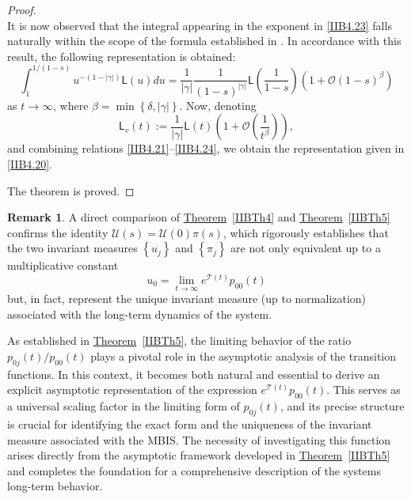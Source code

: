 \documentclass[10pt,reqno]{amsart}
\theoremstyle{definition}
\newtheorem{remark}{Remark}
\numberwithin{equation}{section}
\begin{document}
\begin{proof}
\begin{equation}
\end{equation}
    It is now observed that the integral appearing in the exponent in {\eqref{IIB4.23}} falls naturally
    within the scope of the formula established in {\cite[Th5]{ImMDPI24}}. In accordance with this result, the
    following representation is obtained:
\begin{equation}                \label{IIB4.24}
    \int_{1}^{{1}/{(1-s)}}{{u^{-(1-|\gamma|)}}\textsf{L}(u)du}=\frac{1}{|\gamma|}\frac{1}{{(1-s)}^{|\gamma|}}
    \textsf{L}\left(\frac{1}{1-s}\right)\left(1+\mathcal{O}{{(1-s)}^{\beta}} \right)
\end{equation}
    as $t\to\infty$, where $\beta=\min\left\{\delta,|\gamma|\right\}$. Now, denoting
\[
    {\textsf{L}_v}(t):=\frac{1}{|\gamma|}\textsf{L}(t)\left(1+\mathcal{O}{{\left(\frac{1}{t^{\beta}}\right)}}\right),
\]
    and combining relations {\eqref{IIB4.21}}--{\eqref{IIB4.24}},
    we obtain the representation given in {\eqref{IIB4.20}}.

    The theorem is proved.
\end{proof}

\begin{remark}                  \label{IIBRem4}
    A direct comparison of {\hyperref[IIBTh4]{Theorem}~\ref{IIBTh4}} and {\hyperref[IIBTh5]{Theorem}~\ref{IIBTh5}}
    confirms the identity $\mathcal{U}(s)=\mathcal{U}(0)\pi(s)$, which rigorously establishes that the two invariant
    measures $\left\{{u_{j}}\right\}$ and $\left\{{{\pi}_{j}}\right\}$ are not only equivalent up to a multiplicative
    constant
\[
    {{u}_{0}}={\lim_{t\to\infty}}{{e}^{\mathcal{T}(t)}}{p_{00}}(t)
\]
    but, in fact, represent the unique invariant measure (up to normalization) associated
    with the long-term dynamics of the system.
 \end{remark}

    As established in {\hyperref[IIBTh5]{Theorem}~\ref{IIBTh5}}, the limiting behavior of the ratio $p_{0j}(t)/p_{00}(t)$
    plays a pivotal role in the asymptotic analysis of the transition functions. In this context, it becomes both natural
    and essential to derive an explicit asymptotic representation of the expression $e^{\mathcal{T}(t)}p_{00}(t)$.
    This serves as a universal scaling factor in the limiting form of $p_{0j}(t)$, and its precise structure is
    crucial for identifying the exact form and the uniqueness of the invariant measure associated with the MBIS.
    The necessity of investigating this function arises directly from the asymptotic framework developed
    in {\hyperref[IIBTh5]{Theorem}~\ref{IIBTh5}} and completes the foundation for a comprehensive
    description of the systems long-term behavior.
\end{document}
